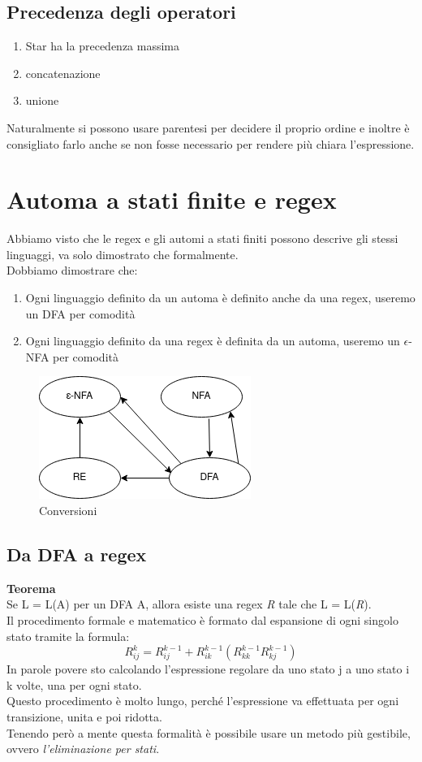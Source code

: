 \documentclass[12pt]{article}
\begin{document}
	\subsection{Precedenza degli operatori}
	\begin{enumerate}
		\item Star ha la precedenza massima
		\item concatenazione
		\item unione
	\end{enumerate}
	Naturalmente si possono usare parentesi per decidere il proprio ordine e inoltre è consigliato farlo anche se non fosse necessario per rendere più chiara l'espressione.

	\section{Automa a stati finite e regex}
	Abbiamo visto che le regex e gli automi a stati finiti possono descrive gli stessi linguaggi, va solo dimostrato che formalmente.
	\\ Dobbiamo dimostrare che:
	\begin{enumerate}
		\item Ogni linguaggio definito da un automa è definito anche da una regex, useremo un DFA per comodità
		\item Ogni linguaggio definito da una regex è definita da un automa, useremo un $\epsilon$-NFA per comodità
	\end{enumerate}

	\begin{figure}[h]
		\includegraphics[scale = 0.7]{media/regex_conv.png}
		\centering
		\caption{Conversioni}
	\end{figure}

	\subsection{Da DFA a regex}
	\textbf{Teorema}
	\\ Se L = L(A) per un DFA A, allora esiste una regex \emph{R} tale che L = L(\emph{R}).
	\\ Il procedimento formale e matematico è formato dal espansione di ogni singolo stato tramite la formula:
	\[ R^{k}_{ij} =  R^{k-1}_{ij} + R^{k-1}_{ik} (R^{k-1}_{kk} R^{k-1}_{kj})\]
	In parole povere sto calcolando l'espressione regolare da uno stato j a uno stato i k volte, una per ogni stato.
	\\ Questo procedimento è molto lungo, perché l'espressione va effettuata per ogni transizione, unita e poi ridotta.
	\\ Tenendo però a mente questa formalità è possibile usare un metodo più gestibile, ovvero \emph{l'eliminazione per stati}.
\end{document}
